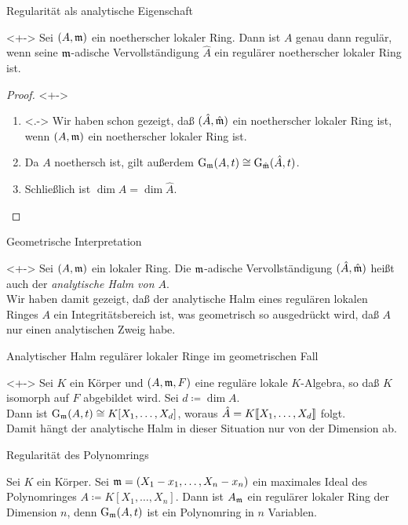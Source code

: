 \begin{frame}{Regularität als analytische Eigenschaft}
	\begin{proposition}<+->
		Sei \((A, \mathfrak{m})\) ein noetherscher lokaler Ring. Dann ist \(A\)
		genau dann regulär, wenn seine \(\mathfrak{m}\)-adische Vervollständigung
		\(\hat A\) ein regulärer noetherscher lokaler Ring ist.
	\end{proposition}
	\begin{proof}<+->
		\begin{enumerate}[<+->]
		\item<.->
			Wir haben schon gezeigt, daß \((\hat A, \hat{\mathfrak{m}})\) ein noetherscher 
			lokaler Ring ist, wenn \((A, \mathfrak{m})\) ein noetherscher lokaler Ring
			ist.
		\item
			Da \(A\) noethersch ist, gilt außerdem
			\(\operatorname{G}_{\mathfrak{m}}(A, t) \cong \operatorname{G}_{\hat{\mathfrak{m}}}(\hat A, t)\). 
		\item
			Schließlich ist \(\dim A = \dim{\hat A}\).
			\qedhere
		\end{enumerate}
	\end{proof}
\end{frame}

\begin{frame}{Geometrische Interpretation}
	\begin{remark}<+->
		Sei \((A, \mathfrak{m})\) ein lokaler Ring. Die \(\mathfrak{m}\)-adische
		Vervollständigung \((\hat A, \hat{\mathfrak{m}})\) heißt auch der
		\emph{analytische Halm von \(A\)}. 
		\\
		Wir haben damit gezeigt, daß der analytische Halm eines regulären
		lokalen Ringes \(A\) ein Integritätsbereich ist, was geometrisch so
		ausgedrückt wird, daß \(A\) nur einen analytischen Zweig habe. 
	\end{remark}
\end{frame}

\begin{frame}{Analytischer Halm regulärer lokaler Ringe im geometrischen Fall}
	\begin{example}<+->
		Sei \(K\) ein Körper und \((A, \mathfrak{m}, F)\) eine reguläre lokale
		\(K\)-Algebra, so daß \(K\) isomorph auf \(F\) abgebildet wird. 
		Sei \(d \coloneqq \dim A\).
		\\
		Dann ist \(\operatorname{G}_{\mathfrak{m}}(A, t) \cong K[X_1, \dotsc, X_d]\),
		woraus \(\hat A = K\llbracket X_1, \dotsc, X_d\rrbracket\) folgt.
		\\
		Damit hängt der analytische Halm in dieser Situation nur von der Dimension
		ab.
	\end{example}
\end{frame}

\begin{frame}{Regularität des Polynomrings}
	\begin{example}
		Sei \(K\) ein Körper. Sei \(\mathfrak{m} = (X_1 - x_1, \dotsc, X_n - x_n)\) ein
		maximales Ideal des Polynomringes \(A \coloneqq K[X_1, \dotsc, X_n]\).
		Dann ist \(A_{\mathfrak{m}}\) ein regulärer lokaler Ring der
		Dimension \(n\), denn
		\(\operatorname{G}_{\mathfrak{m}}(A, t)\) ist ein Polynomring in \(n\) Variablen.
	\end{example}
\end{frame}

